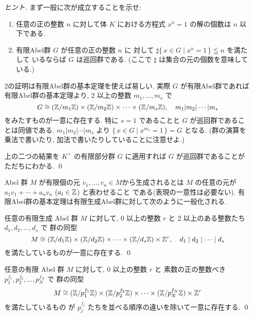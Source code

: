 \documentclass[12pt,twoside]{jarticle}
\begin{document}
\begin{proof}[ヒント]
 まず一般に次が成立することを示せ:
 \begin{enumerate}
  \item 任意の正の整数 $n$ に対して体 $K$ における方程式 $x^n=1$ の解の個数は $n$ 以下である.
  \item 有限Abel群 $G$ が任意の正の整数 $n$ に
    対して $\sharp\{\,x\in G\mid x^n=1\,\}\leqq n$ を満たして
    いるならば $G$ は巡回群である.
    (ここで $\sharp$ は集合の元の個数を意味している.)
 \end{enumerate}
 2の証明は有限Abel群の基本定理を使えば易しい.
 実際 $G$ が有限Abel群であれば有限Abel群の基本定理より, 
 $2$ 以上の整数 $m_1,\ldots,m_s$ で
 \begin{equation*}
  G \cong ({\mathbb Z}/m_1{\mathbb Z})\times({\mathbb Z}/m_2{\mathbb Z})\times\cdots\times({\mathbb Z}/m_s{\mathbb Z}),
  \quad
  m_1|m_2|\cdots|m_s
 \end{equation*}
 をみたすものが一意に存在する. 
 特に $s=1$ であることと $G$ が巡回群であることは同値である.
 $m_1|m_2|\cdots|m_s$ より $\{\,x\in G\mid x^{m_s}=1\,\}=G$ となる.
 (群の演算を乗法で書いたり, 加法で書いたりしていることに注意せよ.)

 上の二つの結果を $K^\times$ の有限部分群 $G$ に適用すれば %
 $G$ が巡回群であることがただちにわかる.
 \qed
\end{proof}

Abel 群 $M$ が有限個の元 $v_1,\ldots,v_n\in M$から生成されるとは %
$M$ の任意の元が $a_1v_1+\cdots+a_nv_n$ ($a_i\in{\mathbb Z}$) と表わせること
である(表現の一意性は必要ない).
有限Abel群の基本定理は有限生成Abel群に対して次のように一般化される.

\begin{theorem}[有限生成Abel群の基本定理1]
 任意の有限生成 Abel 群 $M$ に対して, %
 $0$ 以上の整数 $r$ と %
 $2$ 以上のある整数たち $d_1,d_2,\ldots,d_s$ で
 群の同型
 \begin{equation*}
  M \cong 
  ({\mathbb Z}/d_1{\mathbb Z})\times({\mathbb Z}/d_2{\mathbb Z})\times\cdots\times({\mathbb Z}/d_s{\mathbb Z})\times{\mathbb Z}^r,
  \quad
  d_1\mid d_2\mid \cdots\mid d_s
 \end{equation*}
 を満たしているものが一意に存在する.
 \qed
\end{theorem}

\begin{theorem}[有限生成Abel群の基本定理2]
 任意の有限 Abel 群 $M$ に対して, %
 $0$ 以上の整数 $r$ と %
 素数の正の整数べき $p_1^{f_1}, p_2^{f_2},\ldots, p_N^{f_N}$ で
 群の同型
 \begin{equation*}
  M \cong 
  ({\mathbb Z}/p_1^{f_1}{\mathbb Z})\times({\mathbb Z}/p_2^{f_2}{\mathbb Z})\times\cdots\times({\mathbb Z}/p_N^{f_N}{\mathbb Z})
  \times{\mathbb Z}^r
 \end{equation*}
 を満たしているもの
 が $p_j^{f_j}$ たちを並べる順序の違いを除いて一意に存在する.
 \qed
\end{theorem}
\end{document}

